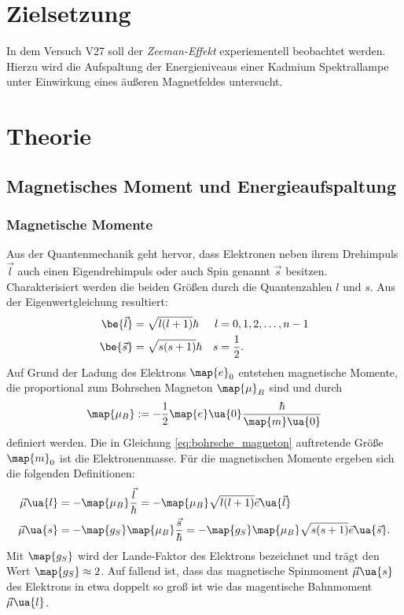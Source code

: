 \setcounter{page}{1}
\section*{Zielsetzung}
In dem Versuch V27 soll der \emph{Zeeman-Effekt} experiementell beobachtet werden.
Hierzu wird die Aufspaltung der Energieniveaus einer Kadmium Spektrallampe
unter Einwirkung eines äußeren Magnetfeldes untersucht.

\section{Theorie}

\subsection{Magnetisches Moment und Energieaufspaltung}
\subsubsection{Magnetische Momente}
Aus der Quantenmechanik geht hervor, dass Elektronen neben ihrem Drehimpuls $\vec{l}$ auch einen
Eigendrehimpuls oder auch Spin genannt $\vec{s}$ besitzen. Charakterisiert werden die beiden Größen durch die
Quantenzahlen $l$ und $s$. Aus der Eigenwertgleichung resultiert:
\begin{align*}
\be{\vec{l}}&=\sqrt{l(l+1)}\hbar & l&=0,1,2,\dots,n-1\\
\be{\vec{s}}&=\sqrt{s(s+1)}\hbar & s&=\frac{1}{2}.
\end{align*}
Auf Grund der Ladung des Elektrons $\map{e}_0$ entstehen magnetische Momente, die
proportional zum Bohrschen Magneton $\map{\mu}_B$ sind und durch
\begin{equation}
  \label{eq:bohrsche_magneton}
  \map{\mu_B}:=-\frac{1}{2}\map{e}\ua{0} \frac{\hbar}{\map{m}\ua{0}}
\end{equation}
definiert werden. Die in Gleichung \eqref{eq:bohrsche_magneton} auftretende Größe $\map{m}_0$ ist die Elektronenmasse.
Für die magnetischen Momente ergeben sich die folgenden Definitionen:
\begin{align*}
  \vec{\mu}\ua{l}&=-\map{\mu_B}\frac{\vec{l}}{\hbar}=-\map{\mu_B}\sqrt{l(l+1)}\vec{e}\ua{\vec{l}} \\
  \vec{\mu}\ua{s}&=-\map{g_S}\map{\mu_B}\frac{\vec{s}}{\hbar}=-\map{g_S}\map{\mu_B}\sqrt{s(s+1)}\vec{e}\ua{\vec{s}}.
\end{align*}
Mit $\map{g_S}$ wird der Lande-Faktor des Elektrons bezeichnet und trägt den Wert $\map{g_S}\approx 2$.
Auf fallend ist, dass das magnetische Spinmoment $\vec{\mu}\ua{s}$ des Elektrons in etwa doppelt
so groß ist wie das magentische Bahnmoment $\vec{\mu}\ua{l}$.

